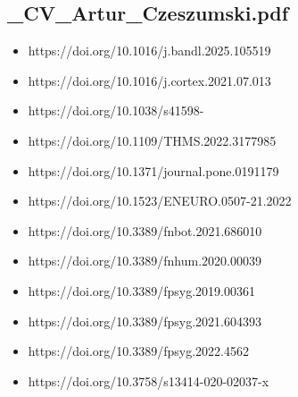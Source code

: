 \documentclass[
  oneside]{article}
\providecommand{\tightlist}{%
  \setlength{\itemsep}{0pt}\setlength{\parskip}{0pt}}
\begin{document}
\subsection{\_CV\_Artur\_Czeszumski.pdf}\label{cv_artur_czeszumski.pdf-1}

\begin{itemize}
\tightlist
\item
  https://doi.org/10.1016/j.bandl.2025.105519
\item
  https://doi.org/10.1016/j.cortex.2021.07.013
\item
  https://doi.org/10.1038/s41598-
\item
  https://doi.org/10.1109/THMS.2022.3177985
\item
  https://doi.org/10.1371/journal.pone.0191179
\item
  https://doi.org/10.1523/ENEURO.0507-21.2022
\item
  https://doi.org/10.3389/fnbot.2021.686010
\item
  https://doi.org/10.3389/fnhum.2020.00039
\item
  https://doi.org/10.3389/fpsyg.2019.00361
\item
  https://doi.org/10.3389/fpsyg.2021.604393
\item
  https://doi.org/10.3389/fpsyg.2022.4562
\item
  https://doi.org/10.3758/s13414-020-02037-x
\end{itemize}
\end{document}
